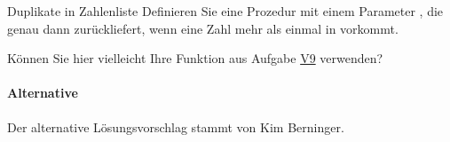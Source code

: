 \documentclass{../tuda-exercise}
\begin{document}
  \begin{task}[credit=\stars{2}{3}]{Duplikate in Zahlenliste}
    \label{task:V10}
    Definieren Sie eine Prozedur  mit einem Parameter
    , die genau dann  zurückliefert, wenn eine Zahl mehr als
    einmal in  vorkommt.

    \begin{note}[title=Hinweis:, color=tuda-orange]
      Können Sie hier vielleicht Ihre Funktion aus Aufgabe \hyperref[task:V9]{V9} verwenden?
    \end{note}

    \begin{solution}
      

      \clearpage

      \paragraph{Alternative}

      Der alternative Lösungsvorschlag stammt von Kim Berninger.
      
    \end{solution}
  \end{task}

  \clearpagesolution
\end{document}
